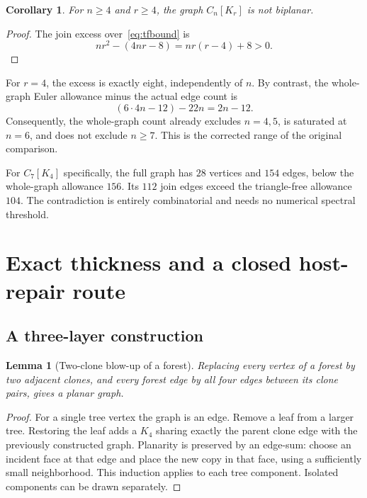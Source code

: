 \documentclass[11pt,letterpaper]{article}
\newtheorem{lemma}[theorem]{Lemma}
\newtheorem{corollary}[theorem]{Corollary}
\theoremstyle{definition}
\theoremstyle{remark}\newtheorem{remark}[theorem]{Remark}
\begin{document}
\begin{corollary}\label{cor:inflated}
For $n\geq4$ and $r\geq4$, the graph $C_n[K_r]$ is not biplanar.
\end{corollary}
\begin{proof}
The join excess over~\eqref{eq:tfbound} is
\[
nr^2-(4nr-8)=nr(r-4)+8>0.
\]
\end{proof}
For $r=4$, the excess is exactly eight, independently of $n$. By contrast, the whole-graph Euler allowance minus the actual edge count is
\[
(6\cdot4n-12)-22n=2n-12.
\]
Consequently, the whole-graph count already excludes $n=4,5$, is saturated at $n=6$, and does not exclude $n\geq7$. This is the corrected range of the original comparison.

For $C_7[K_4]$ specifically, the full graph has $28$ vertices and $154$ edges, below the whole-graph allowance $156$. Its $112$ join edges exceed the triangle-free allowance $104$. The contradiction is entirely combinatorial and needs no numerical spectral threshold.

\section{Exact thickness and a closed host-repair route}
\subsection{A three-layer construction}
\begin{lemma}[Two-clone blow-up of a forest]\label{lem:forest}
Replacing every vertex of a forest by two adjacent clones, and every forest edge by all four edges between its clone pairs, gives a planar graph.
\end{lemma}
\begin{proof}
For a single tree vertex the graph is an edge. Remove a leaf from a larger tree. Restoring the leaf adds a $K_4$ sharing exactly the parent clone edge with the previously constructed graph. Planarity is preserved by an edge-sum: choose an incident face at that edge and place the new copy in that face, using a sufficiently small neighborhood. This induction applies to each tree component. Isolated components can be drawn separately.
\end{proof}
\end{document}
